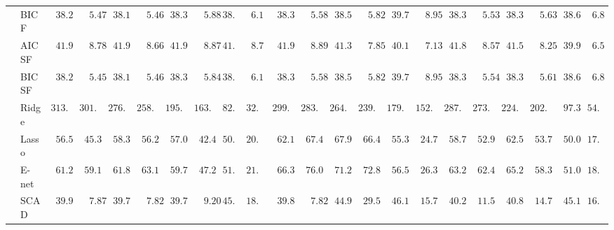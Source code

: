 \begin{tabular}{ll|ll|llllll|llllll|llllll}
 & BIC F  & $\phantom{0}38.25$ & $\phantom{00}5.47$ & $\phantom{0}38.18$ & $\phantom{00}5.46$ & $\phantom{0}38.39$ & $\phantom{00}5.88$ & $38.65$ & $\phantom{0}6.17$ & $\phantom{0}38.37$ & $\phantom{00}5.58$ & $\phantom{0}38.50$ & $\phantom{00}5.82$ & $\phantom{0}39.74$ & $\phantom{00}8.95$ & $\phantom{0}38.31$ & $\phantom{00}5.53$ & $\phantom{0}38.32$ & $\phantom{00}5.63$ & $\phantom{0}38.60$ & $\phantom{0}6.82$ \\
 & AIC SF  & $\phantom{0}41.97$ & $\phantom{00}8.78$ & $\phantom{0}41.99$ & $\phantom{00}8.66$ & $\phantom{0}41.99$ & $\phantom{00}8.87$ & $41.97$ & $\phantom{0}8.74$ & $\phantom{0}41.90$ & $\phantom{00}8.89$ & $\phantom{0}41.35$ & $\phantom{00}7.85$ & $\phantom{0}40.12$ & $\phantom{00}7.13$ & $\phantom{0}41.81$ & $\phantom{00}8.57$ & $\phantom{0}41.56$ & $\phantom{00}8.25$ & $\phantom{0}39.99$ & $\phantom{0}6.58$ \\
 & BIC SF  & $\phantom{0}38.24$ & $\phantom{00}5.45$ & $\phantom{0}38.18$ & $\phantom{00}5.46$ & $\phantom{0}38.37$ & $\phantom{00}5.84$ & $38.65$ & $\phantom{0}6.18$ & $\phantom{0}38.37$ & $\phantom{00}5.58$ & $\phantom{0}38.50$ & $\phantom{00}5.82$ & $\phantom{0}39.74$ & $\phantom{00}8.95$ & $\phantom{0}38.31$ & $\phantom{00}5.54$ & $\phantom{0}38.31$ & $\phantom{00}5.61$ & $\phantom{0}38.60$ & $\phantom{0}6.82$ \\
 & Ridge  & $313.71$ & $301.20$ & $276.94$ & $258.49$ & $195.93$ & $163.58$ & $82.54$ & $32.18$ & $299.65$ & $283.40$ & $264.18$ & $239.13$ & $179.89$ & $152.80$ & $287.89$ & $273.09$ & $224.45$ & $202.18$ & $\phantom{0}97.31$ & $54.41$ \\
 & Lasso  & $\phantom{0}56.51$ & $\phantom{0}45.35$ & $\phantom{0}58.35$ & $\phantom{0}56.25$ & $\phantom{0}57.06$ & $\phantom{0}42.43$ & $50.37$ & $20.90$ & $\phantom{0}62.15$ & $\phantom{0}67.42$ & $\phantom{0}67.93$ & $\phantom{0}66.47$ & $\phantom{0}55.35$ & $\phantom{0}24.72$ & $\phantom{0}58.73$ & $\phantom{0}52.92$ & $\phantom{0}62.58$ & $\phantom{0}53.73$ & $\phantom{0}50.06$ & $17.69$ \\
 & E-net  & $\phantom{0}61.20$ & $\phantom{0}59.12$ & $\phantom{0}61.84$ & $\phantom{0}63.10$ & $\phantom{0}59.74$ & $\phantom{0}47.28$ & $51.12$ & $21.53$ & $\phantom{0}66.35$ & $\phantom{0}76.05$ & $\phantom{0}71.25$ & $\phantom{0}72.80$ & $\phantom{0}56.50$ & $\phantom{0}26.36$ & $\phantom{0}63.29$ & $\phantom{0}62.41$ & $\phantom{0}65.21$ & $\phantom{0}58.31$ & $\phantom{0}51.03$ & $18.77$ \\
 & SCAD  & $\phantom{0}39.91$ & $\phantom{00}7.87$ & $\phantom{0}39.74$ & $\phantom{00}7.82$ & $\phantom{0}39.79$ & $\phantom{00}9.20$ & $45.39$ & $18.48$ & $\phantom{0}39.81$ & $\phantom{00}7.82$ & $\phantom{0}44.96$ & $\phantom{0}29.55$ & $\phantom{0}46.18$ & $\phantom{0}15.74$ & $\phantom{0}40.21$ & $\phantom{0}11.50$ & $\phantom{0}40.81$ & $\phantom{0}14.74$ & $\phantom{0}45.16$ & $16.60$ \\

\end{tabular}
